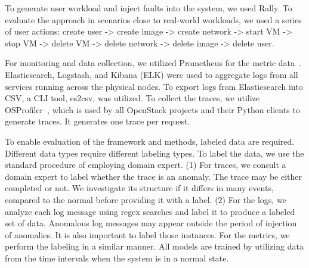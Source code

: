 To generate user workload and inject faults into the system, we used Rally\cite{rally}. To evaluate the approach in scenarios close to real-world workloads, we used a series of user actions: create user -> create image -> create network -> start VM -> stop VM -> delete VM -> delete network -> delete image -> delete user. 

For monitoring and data collection, we utilized Prometheus for the metric data~\cite{turnbull2018monitoring}. Elasticsearch, Logstash, and Kibana (ELK) were used to aggregate logs from all services running across the physical nodes. To export logs from Elasticsearch into CSV, a CLI tool, es2csv, was utilized. To collect the traces, we utilize OSProfiler~\cite{openstack}, which is used by all OpenStack projects and their Python clients to generate traces. It generates one trace per request. 

To enable evaluation of the framework and methods, labeled data are required. Different data types require different labeling types. To label the data, we use the standard procedure of employing domain expert. (1) For traces, we consult a domain expert to label whether the trace is an anomaly. The trace may be either completed or not. We investigate its structure if it differs in many events, compared to the normal before providing it with a label. (2) For the logs, we analyze each log message using regex searches and label it to produce a labeled set of data. Anomalous log messages may appear outside the period of injection of anomalies. It is also important to label those instances. For the metrics, we perform the labeling in a similar manner. All models are trained by utilizing data from the time intervals when the system is in a normal state. 

